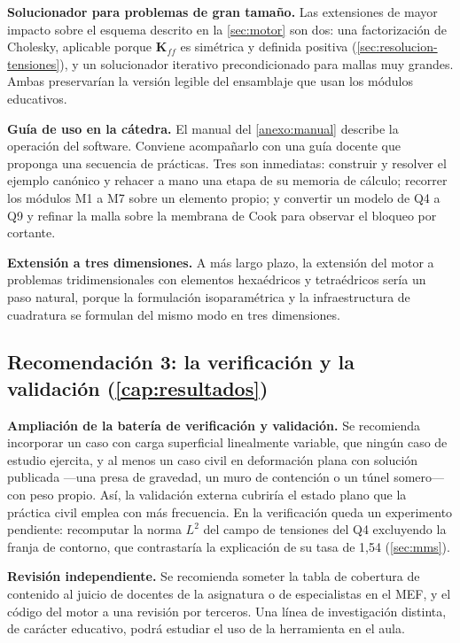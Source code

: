 \textbf{Solucionador para problemas de gran tamaño.} Las extensiones de mayor impacto sobre el esquema descrito en la \autoref{sec:motor} son dos: una factorización de Cholesky, aplicable porque $\bm{K}_{ff}$ es simétrica y definida positiva (\autoref{sec:resolucion-tensiones}), y un solucionador iterativo precondicionado para mallas muy grandes. Ambas preservarían la versión legible del ensamblaje que usan los módulos educativos.

\textbf{Guía de uso en la cátedra.} El manual del \autoref{anexo:manual} describe la operación del software. Conviene acompañarlo con una guía docente que proponga una secuencia de prácticas. Tres son inmediatas: construir y resolver el ejemplo canónico y rehacer a mano una etapa de su memoria de cálculo; recorrer los módulos M1 a M7 sobre un elemento propio; y convertir un modelo de Q4 a Q9 y refinar la malla sobre la membrana de Cook para observar el bloqueo por cortante.

\textbf{Extensión a tres dimensiones.} A más largo plazo, la extensión del motor a problemas tridimensionales con elementos hexaédricos y tetraédricos sería un paso natural, porque la formulación isoparamétrica y la infraestructura de cuadratura se formulan del mismo modo en tres dimensiones.

\subsection*{Recomendación 3: la verificación y la validación (\autoref{cap:resultados})}

\textbf{Ampliación de la batería de verificación y validación.} Se recomienda incorporar un caso con carga superficial linealmente variable, que ningún caso de estudio ejercita, y al menos un caso civil en deformación plana con solución publicada —una presa de gravedad, un muro de contención o un túnel somero— con peso propio. Así, la validación externa cubriría el estado plano que la práctica civil emplea con más frecuencia. En la verificación queda un experimento pendiente: recomputar la norma $L^2$ del campo de tensiones del Q4 excluyendo la franja de contorno, que contrastaría la explicación de su tasa de 1,54 (\autoref{sec:mms}).

\textbf{Revisión independiente.} Se recomienda someter la tabla de cobertura de contenido al juicio de docentes de la asignatura o de especialistas en el MEF, y el código del motor a una revisión por terceros. Una línea de investigación distinta, de carácter educativo, podrá estudiar el uso de la herramienta en el aula.

